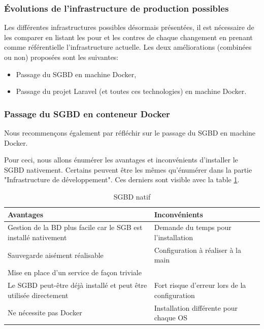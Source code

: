 \documentclass[
    iai, %
    il, %
]{heig-tb}
\begin{document}
\subsubsection{Évolutions de l'infrastructure de production possibles}
Les différentes infrastructures possibles désormais présentées, il est nécessaire de les comparer en listant les pour et les contres de chaque changement en prenant comme référentielle l'infrastructure actuelle.\newline
Les deux améliorations (combinées ou non) proposées sont les suivantes:
\begin{itemize}
    \item Passage du SGBD en machine Docker,
    \item Passage du projet Laravel (et toutes ces technologies) en machine Docker.
\end{itemize}

\subsubsection{Passage du SGBD en conteneur Docker}
Nous recommençons également par réfléchir sur le passage du SGBD en machine Docker.

Pour ceci, nous allons énumérer les avantages et inconvénients d'installer le SGBD nativement.
Certains peuvent être les mêmes qu'énumérer dans la partie "Infrastructure de
développement". Ces derniers sont visible avec la table \ref{prod-db-native}.

\begin{table}[h]
    \begin{center}
        \caption{SGBD natif \label{prod-db-native}}
        \begin{tabularx}{1.0\textwidth} {X|X}
            Avantages                                                         & Inconvénients                          \\ \hline
            Gestion de la BD plus facile car le SGB est installé nativement   & Demande du temps
            pour l'installation                                                                                        \\
            Sauvegarde aisément réalisable                                    & Configuration à réaliser à la main     \\
            Mise en place d'un service de façon triviale                      &                                        \\
            Le SGBD peut-être déjà installé et peut être utilisée directement & Fort risque
            d'erreur lors de la configuration                                                                          \\
            Ne nécessite pas Docker                                           & Installation différente pour chaque OS \\
        \end{tabularx}
    \end{center}
\end{table}
\end{document}
